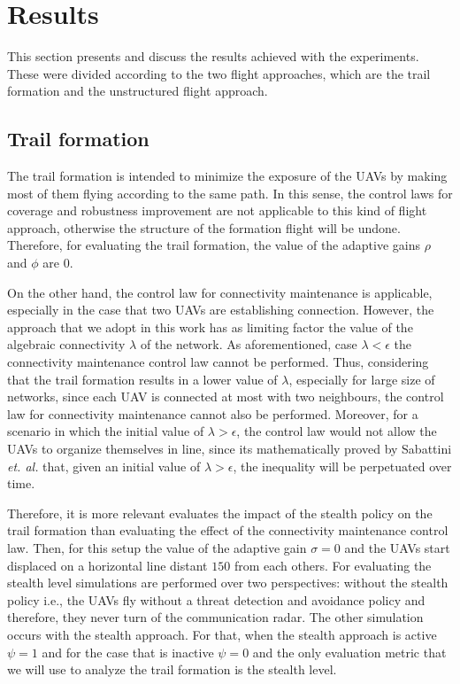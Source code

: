 \section{Results}

This section presents and discuss the results achieved with the experiments. These were divided according to the two flight approaches, which are the trail formation and the unstructured flight approach.

\subsection{Trail formation}

The trail formation is intended to minimize the exposure of the UAVs by making most of them flying according to the same path. In this sense, the control laws for coverage and robustness improvement are not applicable to this kind of flight approach, otherwise the structure of the formation flight will be undone. Therefore, for evaluating the trail formation, the value of the adaptive gains $\rho$ and $\phi$ are $0$. 

On the other hand, the control law for connectivity maintenance is applicable, especially in the case that two UAVs are establishing connection. However, the approach that we adopt in this work has as limiting factor the value of the algebraic connectivity $\lambda$ of the network. As aforementioned, case $\lambda < \epsilon$  the connectivity maintenance control law cannot be performed. Thus, considering that the trail formation results in a lower value of $\lambda$, especially for large size of networks, since each UAV is connected at most with two neighbours, the control law for connectivity maintenance cannot also be performed. Moreover, for a scenario in which the initial value of $\lambda > \epsilon$, the control law would not allow the UAVs to organize themselves in line, since its mathematically proved by Sabattini \textit{et. al.} \cite{sabattiniijrr2013} that, given an initial value of $\lambda > \epsilon$, the inequality will be perpetuated over time. 

Therefore, it is more relevant evaluates the impact of the stealth policy on the trail formation than evaluating the effect of the connectivity maintenance control law. Then, for this setup the value of the adaptive gain $\sigma=0$ and the UAVs start displaced on a horizontal line distant $150$ from each others. For evaluating the stealth level simulations are performed over two perspectives: without the stealth policy i.e., the UAVs fly without a threat detection and avoidance policy and therefore, they never turn of the communication radar. The other simulation occurs with the stealth approach. For that, when the stealth approach is active $\psi=1$ and for the case that is inactive $\psi=0$ and the only evaluation metric that we will use to analyze the trail formation is the stealth level.

